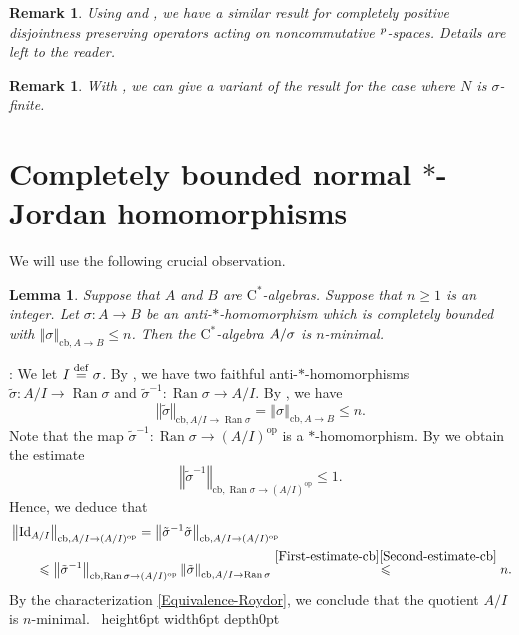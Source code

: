 \documentclass[leqno]{article} %
\let\L\relax
\newcommand{\L}{\mathrm{L}}
\renewcommand{\leq}{\ensuremath{\leqslant}}
\renewcommand{\geq}{\ensuremath{\geqslant}}
\newcommand{\qed}{\hfill \vrule height6pt  width6pt depth0pt}
\newcommand{\norm}[1]{\left\Vert#1\right\Vert}
\newcommand{\co}{\colon}
\newcommand{\ov}{\overset}
\newcommand{\Id}{\mathrm{Id}} %
\newcommand{\op}{\mathrm{op}} %
\let\ker\relax %
\DeclareMathOperator{\ker}{Ker} %
\DeclareMathOperator{\Ran}{Ran} %
\newcommand{\cb}{\mathrm{cb}} %
\newtheorem{lemma}[thm]{Lemma}
\newtheorem{remark}[thm]{Remark}
\newenvironment{proof}[1][]{\noindent {\it Proof #1} : }{\hbox{~}\qed
\smallskip
}
\numberwithin{equation}{section}
\begin{document}
\begin{remark} \normalfont
Using \cite{LMZ1} and \cite{HRW1}, we have a similar result for completely positive disjointness preserving operators acting on noncommutative $\L^p$-spaces. Details are left to the reader.
\end{remark}

\begin{remark} \normalfont
With \cite{JRS1}, we can give a variant of the result for the case where $N$ is $\sigma$-finite.
\end{remark}


\section{Completely bounded normal $*$-Jordan homomorphisms}
\label{Section-cc-isometries}

We will use the following crucial observation.

\begin{lemma}
\label{Petit-lemme-wonderful}
Suppose that $A$ and $B$ are $\mathrm{C}^*$-algebras. Suppose that $n \geq 1$ is an integer. Let $\sigma \co A \to B$ be an anti-$*$-homomorphism which is completely bounded with $\norm{\sigma}_{\cb, A \to B} \leq n$. Then the $\mathrm{C}^*$-algebra $A/\ker \sigma$ is $n$-minimal.
\end{lemma}

\begin{proof}
We let $I \ov{\mathrm{def}}{=} \ker \sigma$. By \cite[Corollary 1.8.3]{Dix}, we have two faithful anti-$*$-homomorphisms $\tilde{\sigma} \co A/I \to \Ran \sigma$ and $\tilde{\sigma}^{-1} \co \Ran \sigma \to A/I$. By \cite[1.2.15]{BLM1}, we have
\begin{equation}
\label{First-estimate-cb}
\norm{\tilde{\sigma}}_{\cb,A/I \to \Ran \sigma}
=\norm{\sigma}_{\cb,A \to B} \leq n.
\end{equation}
Note that the map $\tilde{\sigma}^{-1} \co \Ran \sigma \to (A/I)^\op$ is a $*$-homomorphism. By \cite[Proposition 1.2.4]{BLM1} we obtain the estimate
\begin{equation}
\label{Second-estimate-cb}
\norm{\tilde{\sigma}^{-1}}_{\cb,\Ran \sigma \to (A/I)^\op}
\leq 1.
\end{equation}
Hence, we deduce that
\begin{align*}
\MoveEqLeft
\norm{\Id_{A/I}}_{\cb,A/I \to (A/I)^\op}
= \norm{\tilde{\sigma}^{-1}\tilde{\sigma}}_{\cb,A/I \to (A/I)^\op} \\
&\leq \norm{\tilde{\sigma}^{-1}}_{\cb,\Ran \sigma \to (A/I)^\op} \norm{\tilde{\sigma}}_{\cb,A/I \to \Ran \sigma}
\ov{\eqref{First-estimate-cb} \eqref{Second-estimate-cb}}{\leq} n.
\end{align*} 
By the characterization \eqref{Equivalence-Roydor}, we conclude that the quotient $A/I$ is $n$-minimal.
\end{proof}
\end{document}
